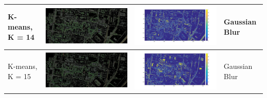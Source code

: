 \documentclass[fleqn,10pt]{SelfArx} %
\begin{document}
\begin{table}
\begin{tabular}{>{\centering\arraybackslash}M{8mm}cc>{\centering\arraybackslash}M{20mm}}
K-means, K = 14 & \includegraphics[clip,scale=0.07]{14rgb.jpg} & \includegraphics[trim={6cm 2.5cm 4.5cm 1.6cm},clip,scale=0.18]{14.jpg} & \vspace{-3cm}Gaussian Blur \\ 
\midrule 
\vspace{-3cm}
\hspace{-0.6cm}
K-means, K = 15 & \includegraphics[clip,scale=0.07]{15rgb.jpg} & \includegraphics[trim={6cm 2.5cm 4.5cm 1.6cm},clip,scale=0.18]{15.jpg} & \vspace{-3cm}Gaussian Blur \\ 

\end{tabular}
\end{table}
\end{document}
